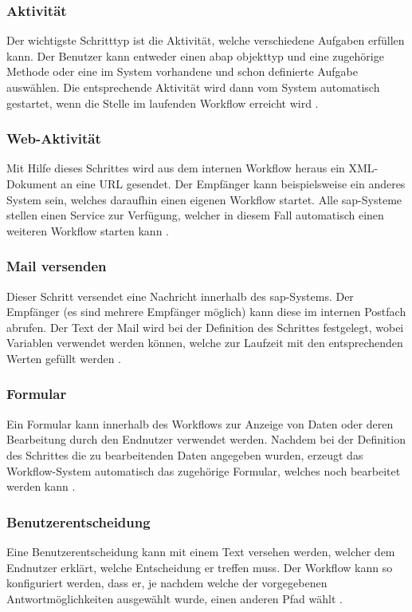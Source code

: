 \subsubsection{Aktivität}
Der wichtigste Schritttyp ist die Aktivität, welche verschiedene Aufgaben erfüllen kann. Der Benutzer kann entweder einen \gls{abap} \gls{objekttyp} und eine zugehörige Methode oder eine im System vorhandene und schon definierte Aufgabe auswählen. Die entsprechende Aktivität wird dann vom System automatisch gestartet, wenn die Stelle im laufenden Workflow erreicht wird \cite{SAPHelp}.

\subsubsection{Web-Aktivität}
Mit Hilfe dieses Schrittes wird aus dem internen Workflow heraus ein XML-Dokument an eine URL gesendet. Der Empfänger kann beispielsweise ein anderes System sein, welches daraufhin einen eigenen Workflow startet. Alle \gls{sap}-Systeme stellen einen Service zur Verfügung, welcher in diesem Fall automatisch einen weiteren Workflow starten kann \cite{SAPHelp}.

\subsubsection{Mail versenden}
Dieser Schritt versendet eine Nachricht innerhalb des \gls{sap}-Systems. Der Empfänger (es sind mehrere Empfänger möglich) kann diese im internen Postfach abrufen. Der Text der Mail wird bei der Definition des Schrittes festgelegt, wobei Variablen verwendet werden können, welche zur Laufzeit mit den entsprechenden Werten gefüllt werden \cite{SAPHelp}.

\subsubsection{Formular}
Ein Formular kann innerhalb des Workflows zur Anzeige von Daten oder deren Bearbeitung durch den Endnutzer verwendet werden. Nachdem bei der Definition des Schrittes die zu bearbeitenden Daten angegeben wurden, erzeugt das Workflow-System automatisch das zugehörige Formular, welches noch bearbeitet werden kann \cite{SAPHelp}. 

\subsubsection{Benutzerentscheidung}
Eine Benutzerentscheidung kann mit einem Text versehen werden, welcher dem Endnutzer erklärt, welche Entscheidung er treffen muss. Der Workflow kann so konfiguriert werden, dass er, je nachdem welche der vorgegebenen Antwortmöglichkeiten ausgewählt wurde, einen anderen Pfad wählt \cite{SAPHelp}.

